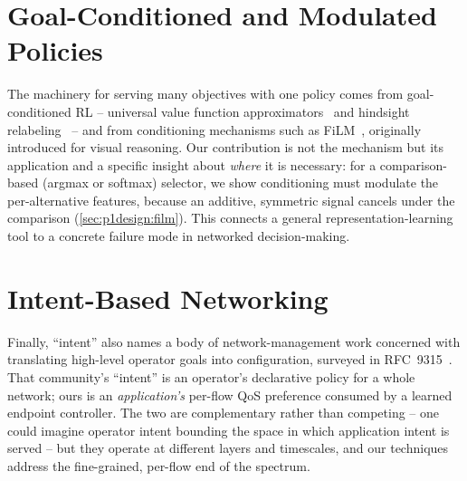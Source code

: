 \section{Goal-Conditioned and Modulated Policies}
\label{sec:rel:gcrl}

The machinery for serving many objectives with one policy comes from goal-conditioned RL -- universal value
function approximators~\cite{Schaul2015} and hindsight relabeling~\cite{Andrychowicz2017} -- and from
conditioning mechanisms such as FiLM~\cite{Perez2018}, originally introduced for visual reasoning. Our
contribution is not the mechanism but its application and a specific insight about \emph{where} it is
necessary: for a comparison-based (argmax or softmax) selector, we show conditioning must modulate the
per-alternative features, because an additive, symmetric signal cancels under the comparison
(\cref{sec:p1design:film}). This connects a general representation-learning tool to a concrete failure mode
in networked decision-making.

\section{Intent-Based Networking}
\label{sec:rel:ibn}

Finally, ``intent'' also names a body of network-management work concerned with translating high-level
operator goals into configuration, surveyed in RFC~9315~\cite{RFC9315}. That community's ``intent'' is an
operator's declarative policy for a whole network; ours is an \emph{application's} per-flow QoS preference
consumed by a learned endpoint controller. The two are complementary rather than competing -- one could
imagine operator intent bounding the space in which application intent is served -- but they operate at
different layers and timescales, and our techniques address the fine-grained, per-flow end of the spectrum.
